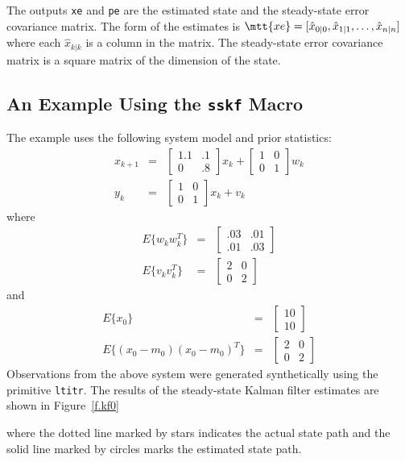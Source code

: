 	The outputs {\tt xe} and {\tt pe} are the estimated state
and the steady-state error covariance matrix.  The form of the
estimates is $\mtt{ xe}=[\hat{x}_{0|0},\hat{x}_{1|1},\ldots,\hat{x}_{n|n}]$
where each $\hat{x}_{k|k}$ is a column in the matrix.  The
steady-state error covariance matrix is a square matrix of the
dimension of the state.

\subsection{An Example Using the {\tt sskf} Macro}
	The example uses the following system model and prior 
statistics:
%
\begin{eqnarray}
x_{k+1}&=&\left[\begin{array}{cc}
              1.1 & .1\\
              0   & .8\end{array}\right]x_k+
         \left[\begin{array}{cc}
              1 & 0\\
              0 & 1\end{array}\right]w_k\nonumber\\
y_k&=&\left[\begin{array}{cc}
              1 & 0\\
              0 & 1\end{array}\right]x_k+v_k\nonumber
\end{eqnarray}
%
where
%
\begin{eqnarray}
E\{w_kw_k^T\}&=&\left[\begin{array}{cc}
              .03 & .01\\
              .01 & .03\end{array}\right]\nonumber\\
E\{v_kv_k^T\}&=&\left[\begin{array}{cc}
              2 & 0\\
              0 & 2\end{array}\right]\nonumber
\end{eqnarray}
%
and
%
\begin{eqnarray}
E\{x_0\}&=&\left[\begin{array}{c}
              10\\
              10\end{array}\right]\nonumber\\
E\{(x_0-m_0)(x_0-m_0)^T\}&=&\left[\begin{array}{cc}
              2 & 0\\
              0 & 2\end{array}\right]\nonumber
\end{eqnarray}
%
Observations from the above system were generated synthetically
using the primitive {\tt ltitr}.
The results of the steady-state Kalman filter estimates 
are shown in Figure~\ref{f.kf0}
%

%
where the dotted line marked by stars indicates
the actual state path and the solid line marked
by circles marks the estimated state path.


